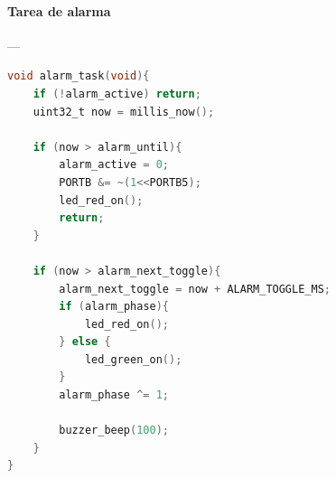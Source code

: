 \paragraph{Tarea de alarma}---\\
\begin{lstlisting}[language=C, caption={Tarea de alarma}]
 void alarm_task(void){
	if (!alarm_active) return;
	uint32_t now = millis_now();
	
	if (now > alarm_until){
		alarm_active = 0;
		PORTB &= ~(1<<PORTB5);
		led_red_on();
		return;
	}
	
	if (now > alarm_next_toggle){
		alarm_next_toggle = now + ALARM_TOGGLE_MS;
		if (alarm_phase){
			led_red_on();
		} else {
			led_green_on();
		}
		alarm_phase ^= 1;
		
		buzzer_beep(100);
	}
}
\end{lstlisting}






